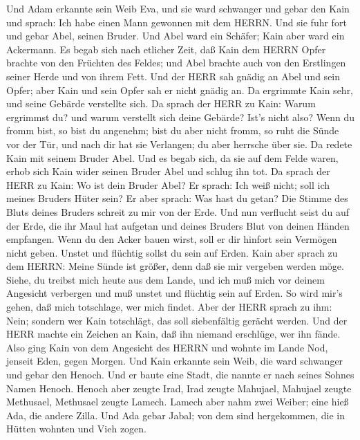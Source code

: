  Und Adam erkannte sein Weib Eva, und sie ward schwanger und
gebar den Kain und sprach: Ich habe einen Mann gewonnen mit dem HERRN.
 Und sie fuhr fort und gebar Abel, seinen Bruder. Und Abel
ward ein Schäfer; Kain aber ward ein Ackermann.  Es begab
sich nach etlicher Zeit, daß Kain dem HERRN Opfer brachte von den
Früchten des Feldes;  und Abel brachte auch von den
Erstlingen seiner Herde und von ihrem Fett. Und der HERR sah gnädig an
Abel und sein Opfer;  aber Kain und sein Opfer sah er nicht
gnädig an. Da ergrimmte Kain sehr, und seine Gebärde verstellte sich.
 Da sprach der HERR zu Kain: Warum ergrimmst du? und warum
verstellt sich deine Gebärde?  Ist's nicht also? Wenn du
fromm bist, so bist du angenehm; bist du aber nicht fromm, so ruht die
Sünde vor der Tür, und nach dir hat sie Verlangen; du aber herrsche über
sie.  Da redete Kain mit seinem Bruder Abel. Und es begab
sich, da sie auf dem Felde waren, erhob sich Kain wider seinen Bruder
Abel und schlug ihn tot.  Da sprach der HERR zu Kain: Wo ist
dein Bruder Abel? Er sprach: Ich weiß nicht; soll ich meines Bruders
Hüter sein?  Er aber sprach: Was hast du getan? Die Stimme
des Bluts deines Bruders schreit zu mir von der Erde.  Und
nun verflucht seist du auf der Erde, die ihr Maul hat aufgetan und
deines Bruders Blut von deinen Händen empfangen.  Wenn du
den Acker bauen wirst, soll er dir hinfort sein Vermögen nicht geben.
Unstet und flüchtig sollst du sein auf Erden.  Kain aber
sprach zu dem HERRN: Meine Sünde ist größer, denn daß sie mir vergeben
werden möge.  Siehe, du treibst mich heute aus dem Lande,
und ich muß mich vor deinem Angesicht verbergen und muß unstet und
flüchtig sein auf Erden. So wird mir's gehen, daß mich totschlage, wer
mich findet.  Aber der HERR sprach zu ihm: Nein; sondern
wer Kain totschlägt, das soll siebenfältig gerächt werden. Und der HERR
machte ein Zeichen an Kain, daß ihn niemand erschlüge, wer ihn fände.
 Also ging Kain von dem Angesicht des HERRN und wohnte im
Lande Nod, jenseit Eden, gegen Morgen.  Und Kain erkannte
sein Weib, die ward schwanger und gebar den Henoch. Und er baute eine
Stadt, die nannte er nach seines Sohnes Namen Henoch. 
Henoch aber zeugte Irad, Irad zeugte Mahujael, Mahujael zeugte
Methusael, Methusael zeugte Lamech.  Lamech aber nahm zwei
Weiber; eine hieß Ada, die andere Zilla.  Und Ada gebar
Jabal; von dem sind hergekommen, die in Hütten wohnten und Vieh zogen.
